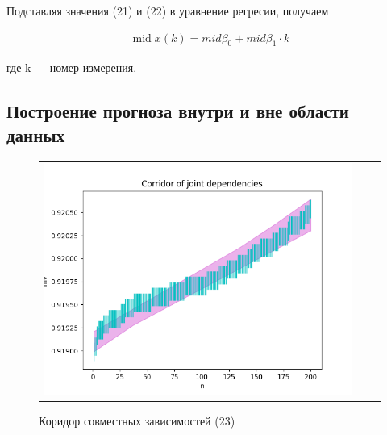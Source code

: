 \documentclass[a4paper,14pt]{article}
\DeclareMathOperator{\midd}{mid}
\begin{document}
	Подставляя значения (21) и (22) в уравнение регресии, получаем
	
	\begin{equation*}
		\begin{gathered}
			\midd x(k) = mid \beta_0 + mid \beta_1 \cdot k
		\end{gathered}
	\end{equation*}

	где k — номер измерения.
	
	\subsection{Построение прогноза внутри и вне области данных}
	\begin{figure}[H]
		\begin{center}
			\begin{tabular}{ccc}
				\includegraphics[scale=0.8]{../image/intervals1.png}
			\end{tabular}
		\end{center}
		\caption{Коридор совместных зависимостей (23)} 
	\end{figure}
\end{document}
